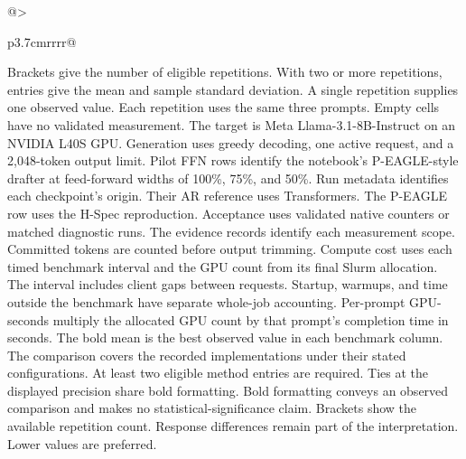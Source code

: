 \documentclass[conference,onecolumn]{IEEEtran}
\begin{document}
\begin{table}[!tp]
\begin{tabular}{@{}>{\raggedright\arraybackslash}p{3.7cm}rrrr@{}}
\bottomrule
\end{tabular}
\par\medskip
\begin{minipage}{\linewidth}\footnotesize
Brackets give the number of eligible repetitions. With two or more repetitions, entries give the mean and sample standard deviation. A single repetition supplies one observed value. Each repetition uses the same three prompts. Empty cells have no validated measurement. The target is Meta Llama-3.1-8B-Instruct on an NVIDIA L40S GPU. Generation uses greedy decoding, one active request, and a 2,048-token output limit. Pilot FFN rows identify the notebook's P-EAGLE-style drafter at feed-forward widths of 100\%, 75\%, and 50\%. Run metadata identifies each checkpoint's origin. Their AR reference uses Transformers. The P-EAGLE row uses the H-Spec reproduction. Acceptance uses validated native counters or matched diagnostic runs. The evidence records identify each measurement scope. Committed tokens are counted before output trimming.
Compute cost uses each timed benchmark interval and the GPU count from its final Slurm allocation. The interval includes client gaps between requests. Startup, warmups, and time outside the benchmark have separate whole-job accounting. Per-prompt GPU-seconds multiply the allocated GPU count by that prompt's completion time in seconds.
The bold mean is the best observed value in each benchmark column. The comparison covers the recorded implementations under their stated configurations. At least two eligible method entries are required. Ties at the displayed precision share bold formatting. Bold formatting conveys an observed comparison and makes no statistical-significance claim. Brackets show the available repetition count. Response differences remain part of the interpretation. Lower values are preferred.
\end{minipage}
\end{table}
\end{document}

